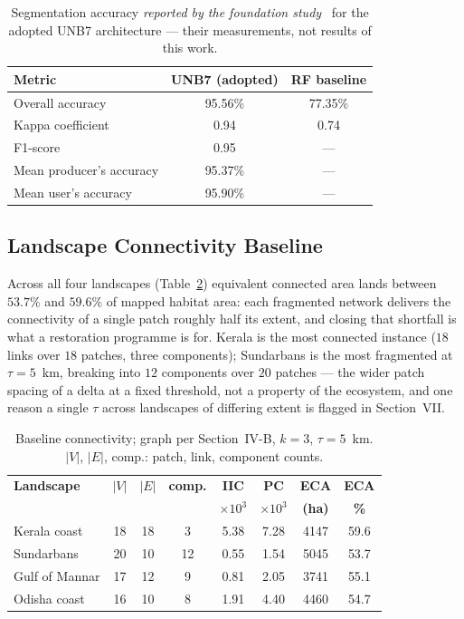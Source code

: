 \documentclass[conference]{IEEEtran}
\begin{document}
\begin{table}[!tbp]
\centering
\caption{Segmentation accuracy \emph{reported by the foundation study}~\cite{ghorbanian2025mangrove} for the adopted UNB7 architecture --- their measurements, not results of this work.}
\label{tab:segbaseline}
\scriptsize
\renewcommand{\arraystretch}{0.95}
\begin{tabular}{@{}lcc@{}}
\toprule
\textbf{Metric} & \textbf{UNB7 (adopted)} & \textbf{RF baseline} \\
\midrule
Overall accuracy & 95.56\% & 77.35\% \\
Kappa coefficient & 0.94 & 0.74 \\
F1-score & 0.95 & --- \\
Mean producer's accuracy & 95.37\% & --- \\
Mean user's accuracy & 95.90\% & --- \\
\bottomrule
\end{tabular}
\end{table}

\subsection{Landscape Connectivity Baseline}

Across all four landscapes (Table~\ref{tab:connbaseline}) equivalent connected area lands between $53.7\%$ and $59.6\%$ of mapped habitat area: each fragmented network delivers the connectivity of a single patch roughly half its extent, and closing that shortfall is what a restoration programme is for. Kerala is the most connected instance ($18$ links over $18$ patches, three components); Sundarbans is the most fragmented at $\tau = 5$~km, breaking into $12$ components over $20$ patches --- the wider patch spacing of a delta at a fixed threshold, not a property of the ecosystem, and one reason a single $\tau$ across landscapes of differing extent is flagged in Section~VII.

\begin{table}[!tbp]
\centering
\caption{Baseline connectivity; graph per Section~IV-B, $k=3$, $\tau = 5$~km. $|V|$, $|E|$, comp.: patch, link, component counts.}
\label{tab:connbaseline}
\scriptsize
\setlength{\tabcolsep}{3.5pt}
\renewcommand{\arraystretch}{0.95}
\begin{tabular}{@{}lccccccc@{}}
\toprule
\textbf{Landscape} & $|V|$ & $|E|$ & \textbf{comp.} & \textbf{IIC} & \textbf{PC} & \textbf{ECA} & \textbf{ECA} \\
 & & & & $\times 10^{3}$ & $\times 10^{3}$ & \textbf{(ha)} & \textbf{\%} \\
\midrule
Kerala coast    & 18 & 18 & 3  & 5.38 & 7.28 & 4147 & 59.6 \\
Sundarbans      & 20 & 10 & 12 & 0.55 & 1.54 & 5045 & 53.7 \\
Gulf of Mannar  & 17 & 12 & 9  & 0.81 & 2.05 & 3741 & 55.1 \\
Odisha coast    & 16 & 10 & 8  & 1.91 & 4.40 & 4460 & 54.7 \\
\bottomrule
\end{tabular}
\end{table}
\end{document}
